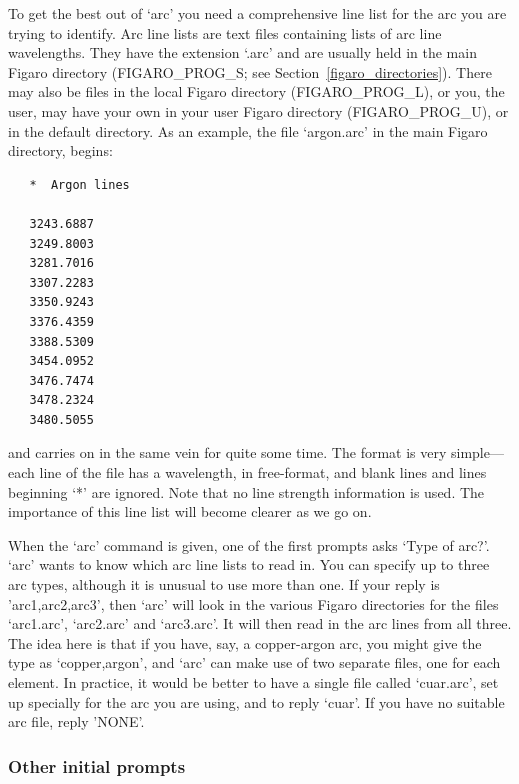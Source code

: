 \documentclass[11pt,twoside]{article}
\newcommand{\htmlref}[2]{#1}
\newcommand{\latorhtm}[2]{#1}
\newcommand{\latorhtm}[2]{#2}
\begin{document}
   To get the best out of `arc' you need a comprehensive line list for
   the arc you are trying to identify.  Arc line lists are text files
   containing lists of arc line wavelengths.  They have the extension
   `.arc' and are usually held in the main Figaro directory
   \latorhtm{(FIGARO\_PROG\_S; see Section~\ref{figaro_directories}).}{
   \htmlref{(FIGARO\_PROG\_S).}{figaro_directories}}
   There may also be files in the local Figaro directory (FIGARO\_PROG\_L),
   or you, the user, may have your own in your user Figaro directory
   (FIGARO\_PROG\_U), or in the default directory.  As an example, the file
   `argon.arc' in the main Figaro directory, begins:

\begin{verbatim}
   *  Argon lines

   3243.6887
   3249.8003
   3281.7016
   3307.2283
   3350.9243
   3376.4359
   3388.5309
   3454.0952
   3476.7474
   3478.2324
   3480.5055
\end{verbatim}

   and carries on in the same vein for quite some time.  The format is
   very simple\latorhtm{---}{-}each line of the file has a wavelength, in
   free-format,
   and blank lines and lines beginning `*' are ignored.  Note that no
   line strength information is used. The importance of this line list
   will become clearer as we go on.

   When the `arc' command is given, one of the first prompts asks `Type
   of arc?'.  `arc' wants to know which arc line lists to read in. You
   can specify up to three arc types, although it is unusual to use more
   than one.  If your reply is 'arc1,arc2,arc3', then `arc' will look in
   the various Figaro directories for the files `arc1.arc', `arc2.arc'
   and `arc3.arc'.  It will then read in the arc lines from all three.
   The idea here is that if you have, say, a copper-argon arc, you might
   give the type as `copper,argon', and `arc' can make use of two
   separate files, one for each element.  In practice, it would be
   better to have a single file called `cuar.arc', set up specially for
   the arc you are using, and to reply `cuar'.  If you have no suitable
   arc file, reply 'NONE'.


\subsubsection{\label{techno10initials}Other initial prompts}
\end{document}
